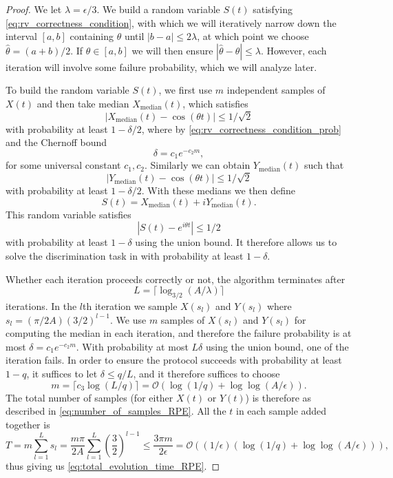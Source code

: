 \documentclass[10pt,a4paper]{amsart}
\begin{document}
\begin{proof}
    We let $\lambda=\epsilon/3$.
    We build a random variable $S(t)$ satisfying \eqref{eq:rv_correctness_condition}, with which we will iteratively narrow down the interval $[a,b]$ containing $\theta$ until $|b-a|\leq 2\lambda$, at which point we choose $\hat{\theta}=(a+b)/2$. If $\theta\in[a,b]$ we will then ensure $|\hat{\theta}-\theta|\leq \lambda$. However, each iteration will involve some failure probability, which we will analyze later.

    To build the random variable $S(t)$, we first use $m$ independent samples of $X(t)$ and then take median $X_{\mathrm{median}}(t)$, which satisfies 
    \[
    |X_{\mathrm{median}}(t)-\cos(\theta t)|\leq 1/\sqrt{2}
    \]
    with probability at least $1-\delta/2$, where by \eqref{eq:rv_correctness_condition_prob} and the Chernoff bound 
    \[
    \delta = c_1 e^{-c_2 m},
    \]
    for some universal constant $c_1,c_2$.
    Similarly we can obtain $Y_{\mathrm{median}}(t)$ such that
    \[
    |Y_{\mathrm{median}}(t)-\cos(\theta t)|\leq 1/\sqrt{2}
    \]
    with probability at least $1-\delta/2$. With these medians we then define
    \[
    S(t) = X_{\mathrm{median}}(t) + iY_{\mathrm{median}}(t).
    \]
    This random variable satisfies
    \[
    |S(t)-e^{i\theta t}|\leq 1/2
    \]
    with probability at least $1-\delta$ using the union bound. It therefore allows us to solve the discrimination task in  with probability at least $1-\delta$.

    Whether each iteration proceeds correctly or not, the algorithm terminates after 
    \[
    L=\lceil \log_{3/2}(A/\lambda) \rceil
    \]
    iterations. In the $l$th iteration we sample $X(s_l)$ and $Y(s_l)$ where $s_l=(\pi/2A)(3/2)^{l-1}$. 
    We use $m$ samples of $X(s_l)$ and $Y(s_l)$ for computing the median in each iteration, and therefore the failure probability is at most $\delta=c_1 e^{-c_2 m}$. 
    With probability at most $L\delta$ using the union bound, one of the iteration fails. 
    In order to ensure the protocol succeeds with probability at least $1-q$, it suffices to let $\delta \leq q/L$, and it therefore suffices to choose
    \[
    m = \lceil c_3 \log(L/q) \rceil=\mathcal{O}(\log(1/q)+\log\log(A/\epsilon)).
    \]
    The total number of samples (for either $X(t)$ or $Y(t)$) is therefore as described in \eqref{eq:number_of_samples_RPE}.
    All the $t$ in each sample added together is
    \begin{equation}
        \label{eq:total_time}
        T = m\sum_{l=1}^{L}  s_l = \frac{m\pi}{2A}\sum_{l=1}^L \left(\frac{3}{2}\right)^{l-1} \leq \frac{3\pi m}{2\epsilon}=\mathcal{O}((1/\epsilon)(\log(1/q)+\log\log(A/\epsilon))),
    \end{equation} 
    thus giving us \eqref{eq:total_evolution_time_RPE}.
\end{proof}
\end{document}
